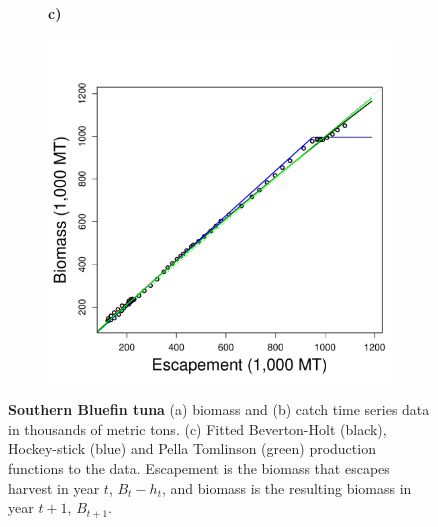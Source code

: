 \documentclass[]{elsarticle} %
\begin{document}
\begin{figure}[!htbp]
\begin{subfigure}[t]{0.3\textwidth}
	\end{subfigure}	
	\begin{subfigure}[t]{0.02\textwidth}
		\textbf{c)}
	\end{subfigure}
	\begin{subfigure}[t]{0.3\textwidth}
		\includegraphics[width=\linewidth,valign=t]{FittedTuna.pdf}
	\end{subfigure}
	\caption{\textbf{Southern Bluefin tuna} (a) biomass and (b) catch time series data in thousands of metric tons. (c) Fitted Beverton-Holt (black), Hockey-stick (blue) and Pella Tomlinson (green) production functions to the data. Escapement is the biomass that escapes harvest in year $t$, $B_t - h_t$, and biomass is the resulting biomass in year $t+1$, $B_{t+1}$.}\label{fig:Tuna}
\end{figure}
\end{document}
